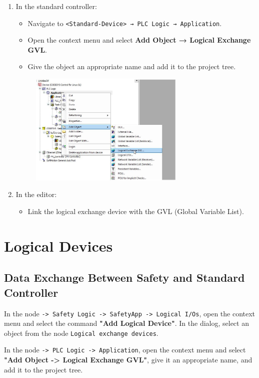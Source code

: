 \documentclass[a4paper,12pt]{article}
\begin{document}
\begin{enumerate}
	\item In the standard controller:
	\begin{itemize}
		\item Navigate to \texttt{<Standard-Device> → PLC Logic → Application}.
		\item Open the context menu and select \textbf{Add Object → Logical Exchange GVL}.
		\item Give the object an appropriate name and add it to the project tree.
	\end{itemize}
		\begin{figure}[H]
		\centering
		\includegraphics[width=0.7\textwidth]{19.JPG}
	\end{figure}
	
	\item In the editor:
	\begin{itemize}
		\item Link the logical exchange device with the GVL (Global Variable List).
	\end{itemize}
\end{enumerate}


\section{Logical Devices}

\subsection{Data Exchange Between Safety and Standard Controller}

In the node \texttt{-> Safety Logic -> SafetyApp -> Logical I/Os}, open the context menu and select the command \textbf{"Add Logical Device"}. In the dialog, select an object from the node \texttt{Logical exchange devices}.

In the node \texttt{-> PLC Logic -> Application}, open the context menu and select \textbf{"Add Object -> Logical Exchange GVL"}, give it an appropriate name, and add it to the project tree.
\end{document}
